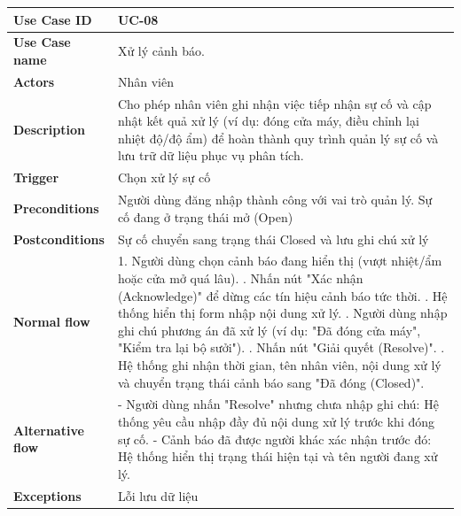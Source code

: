 \begin{tabular}{|p{3.5cm}|p{10.5cm}|}
\hline
\textbf{Use Case ID} & UC-08 \\
\hline
\textbf{Use Case name} & Xử lý cảnh báo. \\
\hline
\textbf{Actors} & Nhân viên \\
\hline
\textbf{Description} & 
Cho phép nhân viên ghi nhận việc tiếp nhận sự cố và cập nhật kết quả xử lý (ví dụ: đóng cửa máy, điều chỉnh lại nhiệt độ/độ ẩm) để hoàn thành quy trình quản lý sự cố và lưu trữ dữ liệu phục vụ phân tích. \\
\hline
\textbf{Trigger} & Chọn xử lý sự cố \\
\hline
\textbf{Preconditions} & Người dùng đăng nhập thành công với vai trò quản lý. Sự cố đang ở trạng thái mở (Open) \\
\hline
\textbf{Postconditions} & Sự cố chuyển sang trạng thái Closed và lưu ghi chú xử lý \\
\hline
\textbf{Normal flow} & 
1. Người dùng chọn cảnh báo đang hiển thị (vượt nhiệt/ẩm hoặc cửa mở quá lâu). \newline
2. Nhấn nút "Xác nhận (Acknowledge)" để dừng các tín hiệu cảnh báo tức thời. \newline
3. Hệ thống hiển thị form nhập nội dung xử lý. \newline
4. Người dùng nhập ghi chú phương án đã xử lý (ví dụ: "Đã đóng cửa máy", "Kiểm tra lại bộ sưởi"). \newline
5. Nhấn nút "Giải quyết (Resolve)". \newline
6. Hệ thống ghi nhận thời gian, tên nhân viên, nội dung xử lý và chuyển trạng thái cảnh báo sang "Đã đóng (Closed)". \\
\hline
\textbf{Alternative flow} & 
- Người dùng nhấn "Resolve" nhưng chưa nhập ghi chú: Hệ thống yêu cầu nhập đầy đủ nội dung xử lý trước khi đóng sự cố. \newline - Cảnh báo đã được người khác xác nhận trước đó: Hệ thống hiển thị trạng thái hiện tại và tên người đang xử lý. \\
\hline
\textbf{Exceptions} & Lỗi lưu dữ liệu \\
\hline
\end{tabular}

